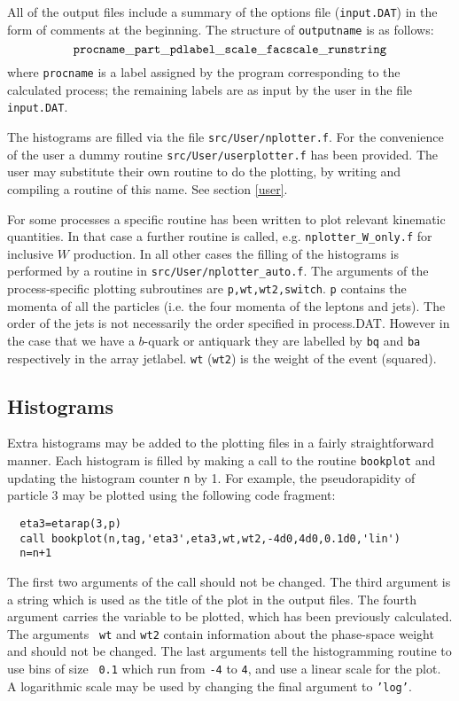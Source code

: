 \documentclass{article}
\begin{document}
All of the output files include a summary of the options file ({\tt input.DAT}) in the form of
comments at the beginning. The structure
of {\tt outputname} is as follows:
\begin{displaymath}
{\tt procname\_part\_pdlabel\_scale\_facscale\_runstring}
\end{displaymath}
where {\tt procname} is a label assigned by the program corresponding to
the calculated process; the remaining labels are as input by the user
in the file {\tt input.DAT}.

The histograms are filled via the file {\tt src/User/nplotter.f}. 
For the convenience of the user a dummy routine {\tt src/User/userplotter.f}
has been provided. The user may substitute their own routine to do the plotting,
by writing and compiling a routine of this name. See section \ref{user}.
 
For some processes
a specific routine has been written to plot relevant kinematic quantities. In that case
a further routine is called, e.g. {\tt nplotter\_W\_only.f} for inclusive $W$ production.
In all other cases the filling of the histograms is performed by a routine in
{\tt src/User/nplotter\_auto.f}. The arguments of the process-specific plotting subroutines
are { \tt p,wt,wt2,switch}. {\tt p} contains the momenta of all the particles
(i.e. the four momenta of the leptons and jets). The order of the jets is not
necessarily the  order specified in process.DAT.  However in the case that we have a 
$b$-quark or antiquark they are labelled by {\tt bq} and {\tt ba} respectively
in the array jetlabel. {\tt wt} ({\tt wt2}) is the weight of the event (squared).  

\subsection{Histograms}
\label{sec:histos}

Extra histograms may be added to the plotting files in
a fairly straightforward manner. Each histogram is filled by making
a call to the routine {\tt bookplot} and updating the histogram
counter {\tt n} by 1. For example, the pseudorapidity of particle $3$
may be plotted using the following code fragment:

\begin{verbatim}
  eta3=etarap(3,p)
  call bookplot(n,tag,'eta3',eta3,wt,wt2,-4d0,4d0,0.1d0,'lin')
  n=n+1
\end{verbatim}
The first two arguments of the call should not be changed. The third
argument is a string which is used as the title of the plot in the
output files. The fourth argument carries the variable to
be plotted, which has been previously calculated. The arguments {\tt
wt} and {\tt wt2} contain information about the phase-space weight and
should not be changed. The
last arguments tell the histogramming routine to use bins of size {\tt
0.1} which run from {\tt -4} to {\tt 4}, and use a linear scale for
the plot. A logarithmic scale may be used by changing the final
argument to {\tt 'log'}.
\end{document}

